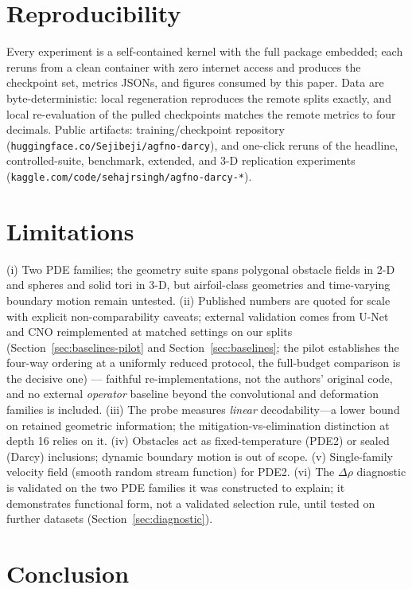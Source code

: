 \documentclass[11pt]{article}
\theoremstyle{definition}
\begin{document}
\section{Reproducibility}
\label{sec:repro}

Every experiment is a self-contained kernel with the full package embedded;
each reruns from a clean container with zero internet access and produces the
checkpoint set, metrics JSONs, and figures consumed by this paper. Data are
byte-deterministic: local regeneration reproduces the remote splits exactly,
and local re-evaluation of the pulled checkpoints matches the remote metrics
to four decimals. Public artifacts: training/checkpoint repository
(\texttt{huggingface.co/Sejibeji/agfno-darcy}), and one-click reruns of the
headline, controlled-suite, benchmark, extended, and 3-D replication
experiments (\texttt{kaggle.com/code/sehajrsingh/agfno-darcy-*}).

\section{Limitations}
\label{sec:limitations}

(i) Two PDE families; the geometry suite spans polygonal obstacle fields in
2-D and spheres and solid tori in 3-D, but airfoil-class geometries and
time-varying boundary motion remain untested. (ii) Published numbers are
quoted for scale with explicit non-comparability caveats; external
validation comes from U-Net and CNO reimplemented at matched settings on
our splits (Section~\ref{sec:baselines-pilot}\ifdefined\UNetRelL{}
and Section~\ref{sec:baselines}\fi;
the pilot establishes the four-way ordering at a uniformly reduced
protocol, the full-budget comparison is the decisive one) --- faithful
re-implementations, not the authors' original code, and no external
\emph{operator} baseline beyond the convolutional and deformation families
is included. (iii) The probe measures \emph{linear}
decodability---a lower bound on retained geometric information; the
mitigation-vs-elimination distinction at depth 16 relies on it.
(iv) Obstacles act as fixed-temperature (PDE2) or sealed (Darcy)
inclusions; dynamic boundary motion is out of scope. (v) Single-family
velocity field (smooth random stream function) for PDE2.
(vi) The $\Delta\rho$ diagnostic is validated on the two PDE families it
was constructed to explain; it demonstrates functional form, not a
validated selection rule, until tested on further datasets
(Section~\ref{sec:diagnostic}).

\section{Conclusion}
\end{document}
